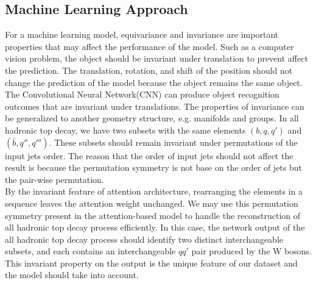 \subsection{Machine Learning Approach}\label{subsec:ML approach}
For a machine learning model, equivariance and invariance are important properties that may affect the performance of the model. Such as a computer vision problem, the object should be invariant under translation to prevent affect the prediction. The translation, rotation, and shift of the position should not change the prediction of the model because the object remains the same object. The Convolutional Neural Network(CNN) can produce object recognition outcomes that are invariant under translations. The properties of invariance can be generalized to another geometry structure, e.g. manifolds and groups. In all hadronic top decay, we have two subsets with the same elements $(b, q, q')$ and $(\bar{b}, q'', q''')$. These subsets should remain invariant under permutations of the input jets order. The reason that the order of input jets should not affect the result is because the permutation symmetry is not base on the order of jets but the pair-wise permutation.
\\
By the invariant feature of attention architecture, rearranging the elements in a sequence leaves the attention weight unchanged. We may use this permutation symmetry present in the attention-based model to handle the reconstruction of all hadronic top decay process efficiently. In this case, the network output of the all hadronic top decay process should identify two distinct interchangeable subsets, and each contains an interchangeable $qq'$ pair produced by the W bosons. This invariant property on the output is the unique feature of our dataset and the model should take into account. 
\\
